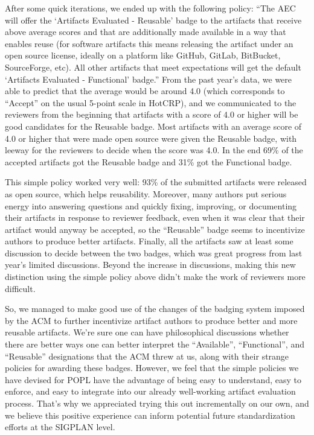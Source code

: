 After some quick iterations, we ended up with the following %
policy: “The AEC will offer the ‘Artifacts Evaluated -
Reusable’ badge to the artifacts that receive above average scores and
that are additionally made available in a way that enables reuse (for
software artifacts this means releasing the artifact under an open
source license, ideally on a platform like GitHub, GitLab, BitBucket,
SourceForge, etc). All other artifacts that meet expectations will get
the default ‘Artifacts Evaluated - Functional’ badge.” From the past
year’s data, we were able to predict that the average would be around
4.0 (which corresponds to “Accept” on the usual 5-point scale in
HotCRP), and we communicated to the reviewers from the beginning that
artifacts with a score of 4.0 or higher will be good candidates for
the Reusable badge. %
%
Most artifacts with an average score of 4.0 or higher that
were made open source were given the Reusable badge, with leeway for
the reviewers to decide when the score was 4.0. In the end 69\% of the
accepted artifacts got the Reusable badge and 31\% got the Functional badge.

This simple policy worked very well:
93\% of the submitted artifacts were released as open source, which
helps reusability. Moreover, many authors put serious energy into
answering questions and quickly fixing, improving, or
documenting their artifacts in response to reviewer feedback, even
when it was clear that their artifact would anyway be accepted, so the
“Reusable” badge seems to incentivize authors to produce better
artifacts. Finally, all the artifacts saw at least some discussion %
to decide between the two badges, which was great progress
from last year’s limited discussions. Beyond the increase in
discussions, making this new distinction using the simple policy above
didn't make the work of reviewers more difficult.


So, we managed to make good use of the changes of the badging system
imposed by the ACM to further incentivize artifact authors to produce
better and more reusable artifacts. We’re sure one can have
philosophical discussions whether there are better ways one can better
interpret the “Available”, “Functional”, and “Reusable” designations
that the ACM threw at us, along with their strange policies for
awarding these badges. However, we feel that the simple policies we have
devised for POPL have the advantage of being easy to understand, easy
to enforce, and easy to integrate into our already well-working
artifact evaluation process. That’s why we appreciated trying this out
incrementally on our own, and we believe this positive experience can
inform potential future standardization efforts at the SIGPLAN level.


